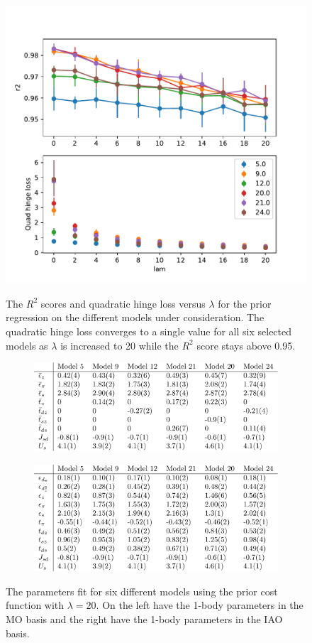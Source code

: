 \documentclass{article}
\begin{document}
\begin{figure}[H]
\centering
\includegraphics[width=0.7\linewidth]{../qwalk/old/ub3lyp_s1_/analysis/figs/prior.pdf}
\label{fig:Prior}
\caption{The $R^2$ scores and quadratic hinge loss versus $\lambda$ for the prior regression on the different models under consideration. The quadratic hinge loss converges to a single value for all six selected models as $\lambda$ is increased to 20 while the $R^2$ score stays above 0.95.}
\end{figure}

\begin{figure}[H]
\centering
\begin{subfigure}{.5\textwidth}
  \centering
  \includegraphics[width=\linewidth]{../qwalk/old/ub3lyp_s1_/analysis/figs/params.pdf}
  \label{fig:Params1}
\end{subfigure}%
\begin{subfigure}{.5\textwidth}
  \centering
  \includegraphics[width=\linewidth]{../qwalk/old/ub3lyp_s1_/analysis/figs/params_iao.pdf}
  \label{fig:Params2}
\end{subfigure}
\label{fig:Params}
\caption{The parameters fit for six different models using the prior cost function with $\lambda = 20$. On the left have the 1-body parameters in the MO basis and the right have the 1-body parameters in the IAO basis.}
\end{figure}
\end{document}

